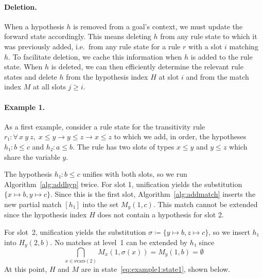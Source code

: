 \documentclass[runningheads,leqno]{llncs}
\newcommand{\para}[1]{\paragraph{\bfseries\upshape #1}}
\newcommand{\All}[2]{\ensuremath{\forall\, #1,\; #2}}
\newcommand{\vars}{\ensuremath{\mathrm{svars}}}
\begin{document}
\para{Deletion.}
When a hypothesis $h$ is removed from a goal's context, we must update the forward state accordingly.
This means deleting $h$ from any rule state to which it was previously added, i.e.\ from any rule state for a rule $r$ with a slot $i$ matching $h$.
To facilitate deletion, we cache this information when $h$ is added to the rule state.
When $h$ is deleted, we can then efficiently determine the relevant rule states and delete $h$ from the hypothesis index $H$ at slot $i$ and from the match index $M$ at all slots $j ≥ i$.

\para{Example 1.}
As a first example, consider a rule state for the transitivity rule $r₁ : \All{x~y~z}{x ≤ y → y ≤ z → x ≤ z}$ to which we add, in order, the hypotheses
$h₁ : b ≤ c$ and $h₂ : a ≤ b$.
The rule has two slots of types $x ≤ y$ and $y ≤ z$ which share the variable $y$.

The hypothesis $h₁ : b ≤ c$ unifies with both slots, so we run Algorithm~\ref{alg:addhyp} twice.
For slot 1, unification yields the substitution $\{x ↦ b, y ↦ c\}$.
Since this is the first slot, Algorithm~\ref{alg:addmatch} inserts the new partial match $[h₁]$ into the set $M_{y}(1, c)$.
This match cannot be extended since the hypothesis index $H$ does not contain a hypothesis for slot 2.

For slot~2, unification yields the substitution $σ ≔ \{y ↦ b, z ↦ c\}$, so we insert $h₁$ into $H_{y}(2, b)$.
No matches at level~1 can be extended by $h₁$ since
\[
  \bigcap_{x \in \vars(2)} M_{x}(1, σ(x)) = M_{y}(1, b) = \emptyset
\]
At this point, $H$ and $M$ are in state~\eqref{eq:example1:state1}, shown below.
\end{document}
